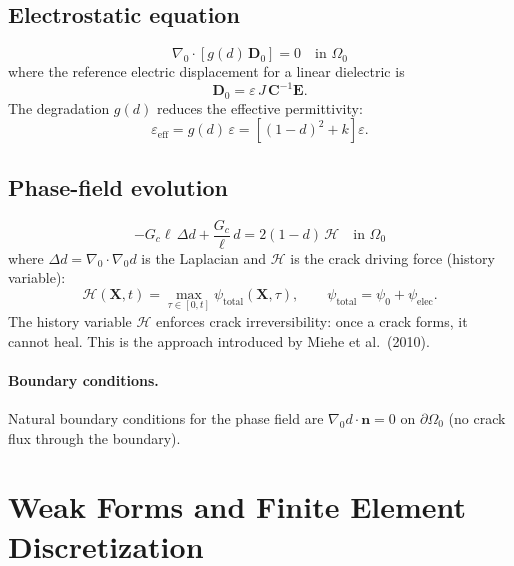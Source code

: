 \documentclass[11pt,a4paper]{article}
\newcommand{\CC}{\bm{C}}
\newcommand{\EE}{\bm{E}}
\newcommand{\DD}{\bm{D}}
\newcommand{\XX}{\bm{X}}
\newcommand{\nn}{\bm{n}}
\newcommand{\Grad}{\nabla_{\!0}}
\begin{document}
\subsection{Electrostatic equation}

\begin{equation}
    \boxed{\Grad \cdot \left[ g(d)\, \DD_0 \right] = 0 \quad \text{in } \Omega_0}
\end{equation}
where the reference electric displacement for a linear dielectric is
\begin{equation}
    \DD_0 = \varepsilon\, J\, \CC^{-1} \EE.
\end{equation}
The degradation $g(d)$ reduces the effective permittivity:
\begin{equation}
    \varepsilon_{\mathrm{eff}} = g(d)\, \varepsilon = \left[(1-d)^2 + k\right] \varepsilon.
\end{equation}

\subsection{Phase-field evolution}

\begin{equation}
    \boxed{-G_c \ell\, \Delta d + \frac{G_c}{\ell}\, d = 2(1-d)\, \mathcal{H} \quad \text{in } \Omega_0}
\end{equation}
where $\Delta d = \Grad \cdot \Grad d$ is the Laplacian and $\mathcal{H}$ is the crack driving force (history variable):
\begin{equation}
    \mathcal{H}(\XX, t) = \max_{\tau \in [0,t]} \psi_{\mathrm{total}}(\XX, \tau), \qquad \psi_{\mathrm{total}} = \psi_0 + \psi_{\mathrm{elec}}.
\end{equation}
The history variable $\mathcal{H}$ enforces crack irreversibility: once a crack forms, it cannot heal. This is the approach introduced by Miehe et al.~(2010).

\paragraph{Boundary conditions.} Natural boundary conditions for the phase field are $\Grad d \cdot \nn = 0$ on $\partial\Omega_0$ (no crack flux through the boundary).

\section{Weak Forms and Finite Element Discretization}
\end{document}
